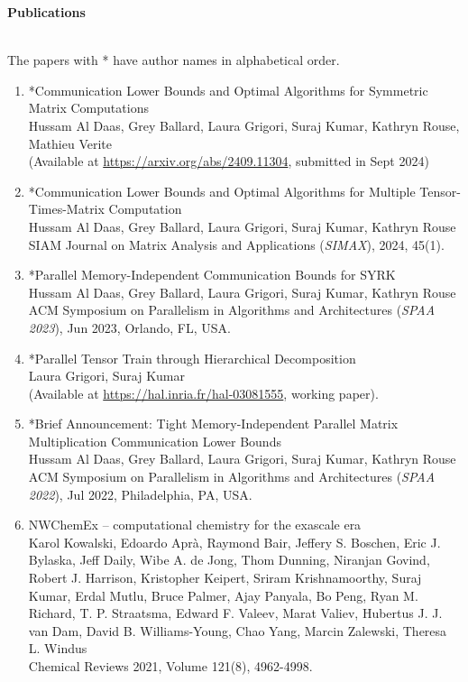 \documentclass[letterpaper,11pt]{article}
\newcommand{\resheading}[1]{{\large \colorbox{mygrey}{\begin{minipage}{\textwidth}{\textbf{#1 \vphantom{p\^{E}}}}\end{minipage}}}}
\begin{document}
\vspace*{0.2in}
\resheading{Publications}
\vspace{0.005in} \\
{\scriptsize The papers with * have author names in alphabetical order.}
\begin{enumerate}
	\item *Communication Lower Bounds and Optimal Algorithms for Symmetric Matrix Computations\\
	Hussam Al Daas, Grey Ballard, Laura Grigori, Suraj Kumar, Kathryn Rouse, Mathieu Verite\\
	(Available at \url{https://arxiv.org/abs/2409.11304}, submitted in Sept 2024)
	
	\item *Communication Lower Bounds and Optimal Algorithms for Multiple Tensor-Times-Matrix Computation\\
	Hussam Al Daas, Grey Ballard, Laura Grigori, Suraj Kumar, Kathryn Rouse\\
	SIAM Journal on Matrix Analysis and Applications (\textit{SIMAX}), 2024, 45(1).
	
	\item *Parallel Memory-Independent Communication Bounds for SYRK\\
	Hussam Al Daas, Grey Ballard, Laura Grigori, Suraj Kumar, Kathryn Rouse\\
	ACM Symposium on Parallelism in Algorithms and Architectures (\textit{SPAA 2023}), Jun 2023, Orlando, FL, USA.
	
	\item *Parallel Tensor Train through Hierarchical Decomposition\\
	Laura Grigori, Suraj Kumar\\
	(Available at \url{https://hal.inria.fr/hal-03081555}, working paper).
	\item *Brief Announcement: Tight Memory-Independent Parallel Matrix Multiplication Communication Lower Bounds\\
	Hussam Al Daas, Grey Ballard, Laura Grigori, Suraj Kumar, Kathryn Rouse\\
	ACM Symposium on Parallelism in Algorithms and Architectures (\textit{SPAA 2022}), Jul 2022, Philadelphia, PA, USA.
	
	\item NWChemEx -- computational chemistry for the exascale era\\
	Karol Kowalski, Edoardo Aprà, Raymond Bair, Jeffery S. Boschen, Eric J.
	Bylaska, Jeff Daily, Wibe A. de Jong, Thom Dunning, Niranjan Govind, 
	Robert J. Harrison, Kristopher Keipert, Sriram Krishnamoorthy, Suraj Kumar, 
	Erdal Mutlu, Bruce Palmer, Ajay Panyala, Bo Peng, Ryan M. Richard, T. P.
	Straatsma, Edward F. Valeev, Marat Valiev, Hubertus J. J. van Dam, David
	B. Williams-Young, Chao Yang, Marcin Zalewski, Theresa L. Windus\\
	Chemical Reviews 2021, Volume 121(8), 4962-4998.
	

\end{enumerate}
\end{document}
